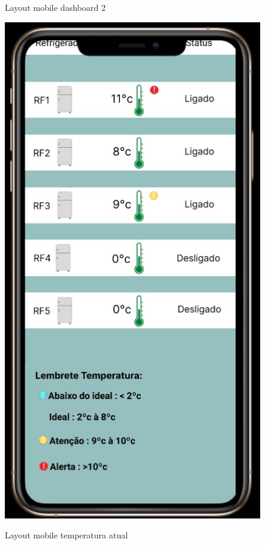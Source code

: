     \begin{figure}
        \begin{minipage}{0.5\textwidth}
            \caption{Layout mobile dashboard 2}
            \centering
            \includegraphics[height=0.4\textheight]{img/mobile/dashboard_2.jpeg}
            \label{fig:mobileDashboard2}
        \end{minipage}%
        \begin{minipage}{0.5\textwidth}
            \caption{Layout mobile temperatura atual}
            \centering

\end{minipage}
\end{figure}
